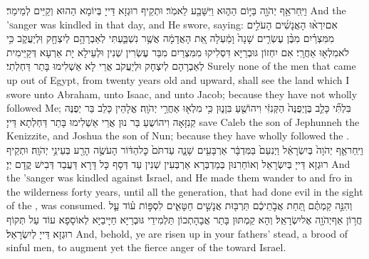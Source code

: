 {וַיִּֽחַר\maqqaf אַ֥ף יְהֹוָ֖ה בַּיּ֣וֹם הַה֑וּא וַיִּשָּׁבַ֖ע לֵאמֹֽר׃}
{וּתְקֵיף רוּגְזָא דַּייָ בְּיוֹמָא הַהוּא וְקַיֵּים לְמֵימַר׃}
{And the \lord\textsc{’s}\space anger was kindled in that day, and He swore, saying:}{}
{אִם\maqqaf יִרְא֨וּ הָאֲנָשִׁ֜ים הָעֹלִ֣ים מִמִּצְרַ֗יִם מִבֶּ֨ן עֶשְׂרִ֤ים שָׁנָה֙ וָמַ֔עְלָה אֵ֚ת הָאֲדָמָ֔ה אֲשֶׁ֥ר נִשְׁבַּ֛עְתִּי לְאַבְרָהָ֥ם לְיִצְחָ֖ק וּֽלְיַעֲקֹ֑ב כִּ֥י לֹא\maqqaf מִלְא֖וּ אַחֲרָֽי׃}
{אִם יִחְזוֹן גּוּבְרַיָּא דִּסְלִיקוּ מִמִּצְרַיִם מִבַּר עֶשְׂרִין שְׁנִין וּלְעֵילָא יָת אַרְעָא דְּקַיֵּימִית לְאַבְרָהָם לְיִצְחָק וּלְיַעֲקֹב אֲרֵי לָא אַשְׁלִימוּ בָּתַר דַּחְלְתִי׃}
{Surely none of the men that came up out of Egypt, from twenty years old and upward, shall see the land which I swore unto Abraham, unto Isaac, and unto Jacob; because they have not wholly followed Me;}{}
{בִּלְתִּ֞י כָּלֵ֤ב בֶּן\maqqaf יְפֻנֶּה֙ הַקְּנִזִּ֔י וִיהוֹשֻׁ֖עַ בִּן\maqqaf נ֑וּן כִּ֥י מִלְא֖וּ אַחֲרֵ֥י יְהֹוָֽה׃}
{אֱלָהֵין כָּלֵב בַּר יְפֻנֶּה קְנִזָּאָה וִיהוֹשֻעַ בַּר נוּן אֲרֵי אַשְׁלִימוּ בָּתַר דַּחְלְתָא דַּייָ׃}
{save Caleb the son of Jephunneh the Kenizzite, and Joshua the son of Nun; because they have wholly followed the \lord.}{}
{וַיִּֽחַר\maqqaf אַ֤ף יְהֹוָה֙ בְּיִשְׂרָאֵ֔ל וַיְנִעֵם֙ בַּמִּדְבָּ֔ר אַרְבָּעִ֖ים שָׁנָ֑ה עַד\maqqaf תֹּם֙ כׇּל\maqqaf הַדּ֔וֹר הָעֹשֶׂ֥ה הָרַ֖ע בְּעֵינֵ֥י יְהֹוָֽה׃}
{וּתְקֵיף רוּגְזָא דַּייָ בְּיִשְׂרָאֵל וְאוֹחַרִנּוּן בְּמַדְבְּרָא אַרְבְּעִין שְׁנִין עַד דְּסָף כָּל דָּרָא דַּעֲבַד דְּבִישׁ קֳדָם יְיָ׃}
{And the \lord\textsc{’s}\space anger was kindled against Israel, and He made them wander to and fro in the wilderness forty years, until all the generation, that had done evil in the sight of the \lord, was consumed.}{}
{וְהִנֵּ֣ה קַמְתֶּ֗ם תַּ֚חַת אֲבֹ֣תֵיכֶ֔ם תַּרְבּ֖וּת אֲנָשִׁ֣ים חַטָּאִ֑ים לִסְפּ֣וֹת ע֗וֹד עַ֛ל חֲר֥וֹן אַף\maqqaf יְהֹוָ֖ה אֶל\maqqaf יִשְׂרָאֵֽל׃}
{וְהָא קַמְתּוּן בָּתַר אֲבָהָתְכוֹן תַּלְמִידֵי גּוּבְרַיָּא חַיָּיבַיָּא לְאוֹסָפָא עוֹד עַל תְּקוֹף רוּגְזָא דַּייָ לְיִשְׂרָאֵל׃}
{And, behold, ye are risen up in your fathers’ stead, a brood of sinful men, to augment yet the fierce anger of the \lord\space toward Israel.}{}
